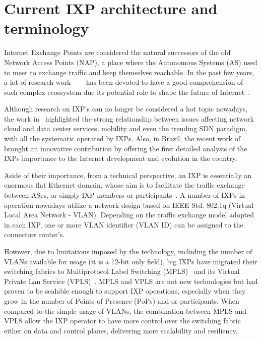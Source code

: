 \documentclass[conference]{IEEEtran/IEEEtran}
\begin{document}
\section{Current IXP architecture and terminology}
\label{ixp_intro}

Internet Exchange Points are considered the natural successors of the old Network Access Points (NAP), a place where the Autonomous Systems (AS) used to meet to exchange traffic and keep themselves reachable. In the past few years, a lot of research work ~\cite{ager2012anatomy}~\cite{haddadi2013}~\cite{chatzis2013benefits} has been devoted to have a good comprehension of such complex ecossystem due its potential role to shape the future of Internet~\cite{kloti2016comparative}.

Although research on IXP's can no longer be considered a hot topic nowadays, the work in~\cite{chatzis2013importance} highlighted the strong relationship between issues affecting network cloud and data center services, mobility and even the trending SDN paradigm, with all the systematic operated by IXPs. Also, in Brazil, the recent work of~\cite{brito2015anatomia} brought an innovative contribution by offering the first detailed analysis of the IXPs importance to the Internet development and evolution in the country. 

Aside of their importance, from a technical perspective, an IXP is essentially an enormous flat Ethernet domain, whose aim is to facilitate the traffic exchange between ASes, or simply IXP members or participants~\cite{euroix2012}. A number of IXPs in operation nowadays utilize a network design based on IEEE Std. 802.1q (Virtual Local Area Network - VLAN). Depending on the traffic exchange model adopted in each IXP, one or more VLAN identifier (VLAN ID) can be assigned to the connectors router's.

However, due to limitations imposed by the technology, including the number of VLANs available for usage (it is a 12-bit only field), big IXPs have migrated their switching fabrics to Multiprotocol Label Switching (MPLS)~\cite{rfc3031} and its Virtual Private Lan Service (VPLS)~\cite{rfc4761,rfc4762}. MPLS and VPLS are not new technologies but had proven to be scalable enough to support IXP operations, especially when they grow in the number of Points of Presence (PoPs) and or participants. When compared to the simple usage of VLANs, the combination between MPLS and VPLS allow the IXP operator to have more control over the switching fabric either on data and control planes, delivering more scalability and resiliency. 
\end{document}
